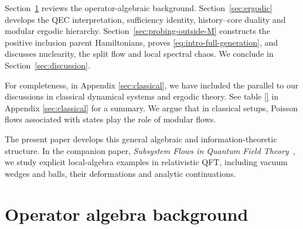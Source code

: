 \documentclass[a4paper,11pt]{article}
\theoremstyle{definition}
\begin{document}
Section~\ref{section:basics} reviews the operator-algebraic background.  Section~\ref{sec:ergodic} develops the QEC interpretation, sufficiency identity, history--core duality and modular ergodic hierarchy.  Section~\ref{sec:probing-outside-M} constructs the positive inclusion parent Hamiltonians, proves \eqref{eq:intro-full-generation}, and discusses nuclearity, the split flow and local spectral chaos.  We conclude in Section~\ref{sec:discussion}.  

For completeness, in Appendix \ref{sec:classical}, we have included the parallel to our discussions in classical dynamical systems and ergodic theory. See table \ref{} in Appendix \ref{sec:classical} for a summary. We argue that in classical setups, Poisson flows associated with states play the role of modular flows.

The present paper develops this general algebraic and information-theoretic structure.  In the companion paper, \emph{Subsystem Flows in Quantum Field Theory}~\cite{companionQFT}, we study explicit local-algebra examples in relativistic QFT, including vacuum wedges and balls, their deformations and analytic continuations.


\section{Operator algebra background}\label{section:basics}
\end{document}
